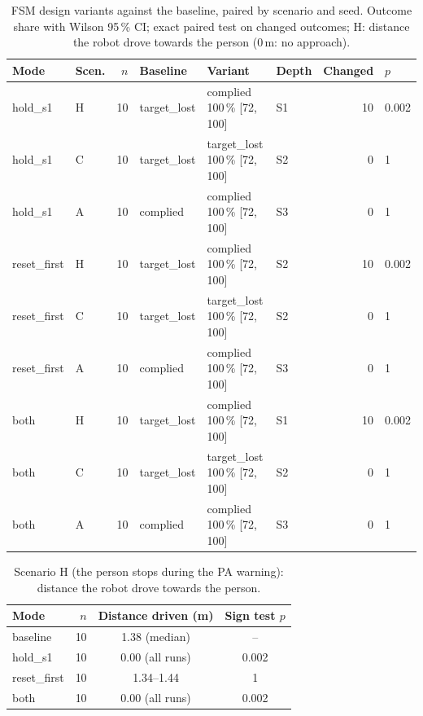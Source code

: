 \begin{table}[t]\centering\small
\caption{FSM design variants against the baseline, paired by scenario and seed. Outcome share with Wilson 95\,\% CI; exact paired test on changed outcomes; H: distance the robot drove towards the person (0\,m: no approach).}
\begin{tabular}{llrlllrl}
\toprule
Mode & Scen. & $n$ & Baseline & Variant & Depth & Changed & $p$ \\
\midrule
hold\_s1 & H & 10 & target\_lost & complied 100\,\% [72, 100] & S1 & 10 & 0.002 \\
hold\_s1 & C & 10 & target\_lost & target\_lost 100\,\% [72, 100] & S2 & 0 & 1 \\
hold\_s1 & A & 10 & complied & complied 100\,\% [72, 100] & S3 & 0 & 1 \\
reset\_first & H & 10 & target\_lost & complied 100\,\% [72, 100] & S2 & 10 & 0.002 \\
reset\_first & C & 10 & target\_lost & target\_lost 100\,\% [72, 100] & S2 & 0 & 1 \\
reset\_first & A & 10 & complied & complied 100\,\% [72, 100] & S3 & 0 & 1 \\
both & H & 10 & target\_lost & complied 100\,\% [72, 100] & S1 & 10 & 0.002 \\
both & C & 10 & target\_lost & target\_lost 100\,\% [72, 100] & S2 & 0 & 1 \\
both & A & 10 & complied & complied 100\,\% [72, 100] & S3 & 0 & 1 \\
\bottomrule
\end{tabular}
\end{table}

\begin{table}[t]\centering\small
\caption{Scenario H (the person stops during the PA warning): distance the robot drove towards the person.}
\begin{tabular}{lrcc}
\toprule
Mode & $n$ & Distance driven (m) & Sign test $p$ \\
\midrule
baseline & 10 & 1.38 (median) & -- \\
hold\_s1 & 10 & 0.00 (all runs) & 0.002 \\
reset\_first & 10 & 1.34--1.44 & 1 \\
both & 10 & 0.00 (all runs) & 0.002 \\
\bottomrule
\end{tabular}
\end{table}
